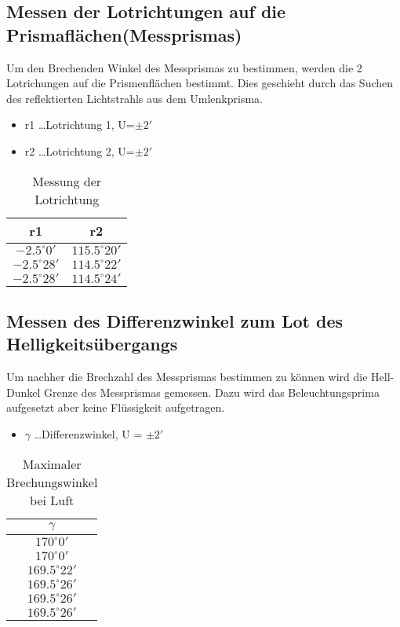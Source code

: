 \documentclass[a4paper]{article}
\begin{document}
\subsection{Messen der Lotrichtungen auf die Prismaflächen(Messprismas)}
Um den Brechenden Winkel des Messprismas zu bestimmen, werden die 2 Lotrichungen auf die Prismenflächen bestimmt. Dies geschieht durch das Suchen des reflektierten Lichtstrahls aus dem Umlenkprisma.
\begin{table}[ht]
  \caption{Messung der Lotrichtung}
  \centering
  \begin{itemize}
    \item r1 \dots Lotrichtung 1, U=$\pm 2'$
    \item r2 \dots Lotrichtung 2, U=$\pm 2'$
  \end{itemize}
  \begin{tabular}{|c|c|}
    \hline
    r1&r2\\
    \hline
    $-2.5^\circ 0'$	& $115.5^\circ 20'$ \\
    \hline
    $-2.5^\circ 28'$	& $114.5^\circ 22'$ \\
    \hline
    $-2.5^\circ 28'$	& $114.5^\circ 24'$ \\
    \hline
  \end{tabular}
  \label{tab:lot}
\end{table}

\subsection{Messen des Differenzwinkel zum Lot des Helligkeitsübergangs}
Um nachher die Brechzahl des Messprismas bestimmen zu können wird die Hell-Dunkel Grenze des Messprismas gemessen. Dazu wird das Beleuchtungsprima aufgesetzt aber keine Flüssigkeit aufgetragen.
\begin{table}[ht]
  \centering
  \caption{Maximaler Brechungswinkel bei Luft}
  \begin{itemize}
    \item $\gamma$ \dots Differenzwinkel, U = $\pm 2'$
  \end{itemize}
  \begin{tabular}{|c|}\hline
    $\gamma$\\ \hline
    $170^\circ 0'$\\\hline
    $170^\circ 0'$\\\hline
    $169.5^\circ 22'$\\\hline
    $169.5^\circ 26'$\\\hline
    $169.5^\circ 26'$\\\hline
    $169.5^\circ 26'$\\\hline
  \end{tabular}
  \label{tab:luft}
\end{table}
\newpage
\end{document}
